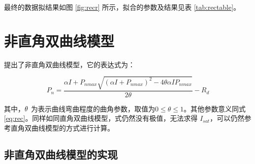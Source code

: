 \documentclass[]{krantz}
\theoremstyle{definition}
\theoremstyle{definition}
\theoremstyle{definition}
\theoremstyle{remark}
\begin{document}
最终的数据拟结果如图 \ref{fig:recr} 所示，拟合的参数及结果见表
\ref{tab:rectable}。

\cleardoublepage

\section{非直角双曲线模型}\label{nonrec_mod}

\citet{Thornley1976} 提出了非直角双曲线模型，它的表达式为：

\begin{equation}
P_{n} = \frac{\alpha I + P_{nmax} \sqrt{(\alpha I + P_{nmax})^{2} - 4  \theta \alpha I P_{nmax}}}{2 \theta} - R_{d}
\label{eq:nrec}
\end{equation}

其中，\(\text{\ensuremath{\theta}}\)
为表示曲线弯曲程度的曲角参数，取值为\(0\leq \theta \leq 1\)。其他参数意义同式
\eqref{eq:rec}。同样如同直角双曲线模型，式仍然没有极值，无法求得
\(I_{sat}\)，可以仍然参考直角双曲线模型的方式进行计算。

\subsection{非直角双曲线模型的实现}\label{nonrec_mode_exam}
\end{document}
